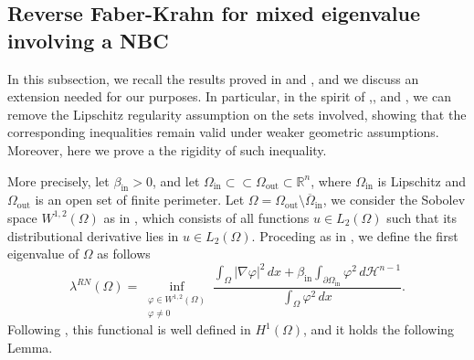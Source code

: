 \documentclass[oneside,a4paper,11pt,notitlepage]{article}
\theoremstyle{plain}
\numberwithin{teor}{section}
\numberwithin{equation}{section}
\theoremstyle{definition}
\theoremstyle{plain}
\theoremstyle{plain}
\theoremstyle{plain}
\theoremstyle{plain}
\theoremstyle{definition}
\theoremstyle{definition}
\theoremstyle{plain}
\begin{document}
\subsection{Reverse Faber-Krahn for mixed eigenvalue involving a NBC}
In this subsection, we recall the results proved in \cite{DPP} and \cite{Paoli_Piscitelli_Trani}, 
and we discuss an extension needed for our purposes. In particular, in the spirit of \cite{bg2},\cite{dTAMS}, and \cite{L}, we can remove the 
Lipschitz regularity assumption on the sets involved, showing that the corresponding 
inequalities remain valid under weaker geometric assumptions.
Moreover, here we prove a the rigidity of such inequality.

More precisely, let $\beta_{\mathrm{in}} > 0$, and let $\Omega_{\mathrm{in}} \subset\subset \Omega_{\mathrm{out}} \subset \mathbb{R}^n$, where $\Omega_{\mathrm{in}}$ is Lipschitz and $\Omega_{\mathrm{out}}$ is an open set of finite perimeter. Let $\Omega = \Omega_{\mathrm{out}} \setminus \overline{\Omega}_{\mathrm{in}}$, we consider the Sobolev space $W^{1,2}(\Omega)$ as in \cite[Chapter~1]{mazya}, which consists of all functions $ u \in L_2(\Omega)$
such that its distributional derivative lies in $ u \in L_2(\Omega)$. Proceding as in \cite{dTAMS, BG}, we
define the first eigenvalue of $\Omega$ as follows
\begin{equation}
\label{RN}
\lambda^{RN}(\Omega)
= \inf_{\substack{\varphi \in W^{1,2}(\Omega) \\ \varphi \ne 0}}
\frac{\displaystyle 
      \int_\Omega |\nabla \varphi|^2\, dx 
      + \beta_{\mathrm{in}} \int_{\partial \Omega_{\mathrm{in}}} \varphi^2\, d\mathcal{H}^{n-1}
     }
     {\displaystyle 
      \int_\Omega \varphi^2\, dx
     }.
\end{equation}
 Following \cite{bg2}, this functional is well defined in $H^1(\Omega)$, and it holds the following Lemma.
\end{document}
